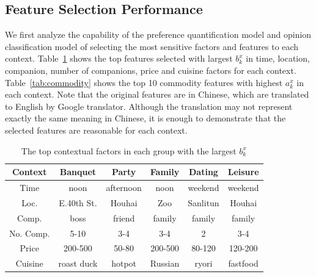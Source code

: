 \documentclass[preprint,12pt]{elsarticle}
\begin{document}
\subsection{Feature Selection Performance}
We first analyze the capability of the preference quantification model and opinion classification model of selecting the most sensitive factors and features to each context. Table~\ref{tab:factor} shows the top features selected with largest $b^x_k$ in time, location, companion, number of companions, price and cuisine factors for each context. Table~\ref{tab:commodity} shows the top 10 commodity features with highest $a^x_k$ in each context. Note that the original features are in Chinese, which are translated to English by Google translator. Although the translation may not represent exactly the same meaning in Chinese, it is enough to demonstrate that the selected features are reasonable for each context.
\begin{table}[htbp]\label{tab:factor}
\footnotesize
\centering
\caption{The top contextual factors in each group with the largest $b^x_k$}
\begin{tabular}{|c|c|c|c|c|c|}
  \hline
  Context & Banquet & Party & Family & Dating & Leisure \\\hline\hline
  Time & noon & afternoon & noon & weekend & weekend \\\hline
  Loc. & E.40th St. & Houhai& Zoo & Sanlitun & Houhai \\\hline
  Comp. & boss & friend & family & family & family \\\hline
  No. Comp. & 5-10 & 3-4 & 3-4 & 2 & 3-4 \\\hline
  Price & 200-500 & 50-80 & 200-500 & 80-120 & 120-200 \\\hline
  Cuisine & roast duck & hotpot &  Russian & ryori & fastfood \\\hline
\end{tabular}
\end{table}
\end{document}
